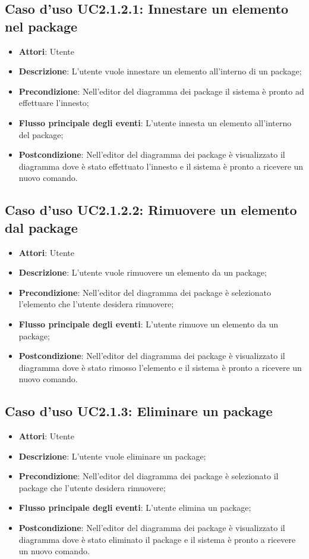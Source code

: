 \documentclass[../AnalisiDeiRequisiti.tex]{subfiles}
\begin{document}
	\subsection{Caso d'uso UC2.1.2.1: Innestare un elemento nel package}
	\begin{itemize}
		\item \textbf{Attori}: Utente
		\item \textbf{Descrizione}: L'utente vuole innestare un elemento all'interno di un package;
		\item \textbf{Precondizione}: Nell'editor del diagramma dei package il sistema è pronto ad effettuare l'innesto;
		\item \textbf{Flusso principale degli eventi}: L'utente innesta un elemento all'interno del package;
		\item \textbf{Postcondizione}: Nell'editor del diagramma dei package è visualizzato il diagramma dove è stato effettuato l'innesto e il sistema è pronto a ricevere un nuovo comando.
	\end{itemize}
	\subsection{Caso d'uso UC2.1.2.2: Rimuovere un elemento dal package}
	\begin{itemize}
		\item \textbf{Attori}: Utente
		\item \textbf{Descrizione}: L'utente vuole rimuovere un elemento da un package;
		\item \textbf{Precondizione}: Nell'editor del diagramma dei package è selezionato l'elemento che l'utente desidera rimuovere;
		\item \textbf{Flusso principale degli eventi}: L'utente rimuove un elemento da un package;
		\item \textbf{Postcondizione}: Nell'editor del diagramma dei package è visualizzato il diagramma dove è stato rimosso l'elemento e il sistema è pronto a ricevere un nuovo comando.
	\end{itemize}
	\subsection{Caso d'uso UC2.1.3: Eliminare un package}
	\begin{itemize}
		\item \textbf{Attori}: Utente
		\item \textbf{Descrizione}: L'utente vuole eliminare un package;
		\item \textbf{Precondizione}: Nell'editor del diagramma dei package è selezionato il package che l'utente desidera rimuovere;
		\item \textbf{Flusso principale degli eventi}: L'utente elimina un package;
		\item \textbf{Postcondizione}: Nell'editor del diagramma dei package è visualizzato il diagramma dove è stato eliminato il package e il sistema è pronto a ricevere un nuovo comando.
	\end{itemize}
\end{document}
